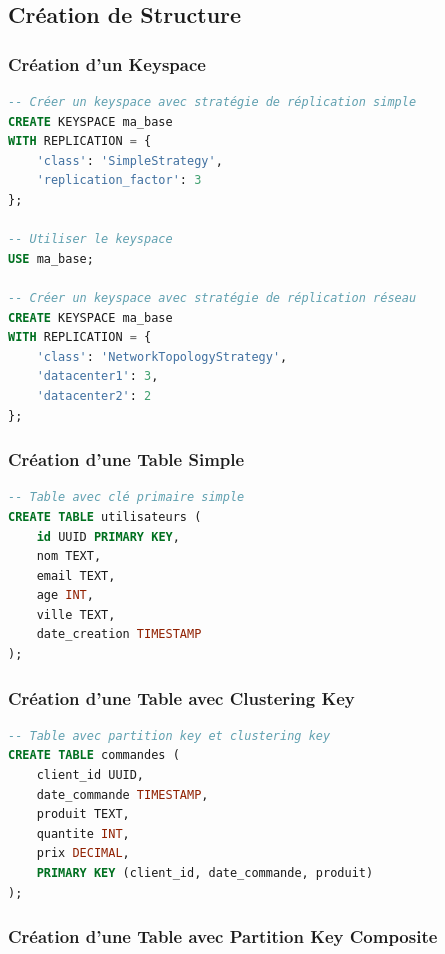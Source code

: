 \documentclass[11pt,a4paper]{article}
\begin{document}
\subsection{Création de Structure}

\subsubsection{Création d'un Keyspace}

\begin{lstlisting}[language=SQL]
-- Créer un keyspace avec stratégie de réplication simple
CREATE KEYSPACE ma_base
WITH REPLICATION = {
    'class': 'SimpleStrategy',
    'replication_factor': 3
};

-- Utiliser le keyspace
USE ma_base;

-- Créer un keyspace avec stratégie de réplication réseau
CREATE KEYSPACE ma_base
WITH REPLICATION = {
    'class': 'NetworkTopologyStrategy',
    'datacenter1': 3,
    'datacenter2': 2
};
\end{lstlisting}

\subsubsection{Création d'une Table Simple}

\begin{lstlisting}[language=SQL]
-- Table avec clé primaire simple
CREATE TABLE utilisateurs (
    id UUID PRIMARY KEY,
    nom TEXT,
    email TEXT,
    age INT,
    ville TEXT,
    date_creation TIMESTAMP
);
\end{lstlisting}

\subsubsection{Création d'une Table avec Clustering Key}

\begin{lstlisting}[language=SQL]
-- Table avec partition key et clustering key
CREATE TABLE commandes (
    client_id UUID,
    date_commande TIMESTAMP,
    produit TEXT,
    quantite INT,
    prix DECIMAL,
    PRIMARY KEY (client_id, date_commande, produit)
);
\end{lstlisting}

\subsubsection{Création d'une Table avec Partition Key Composite}
\end{document}
